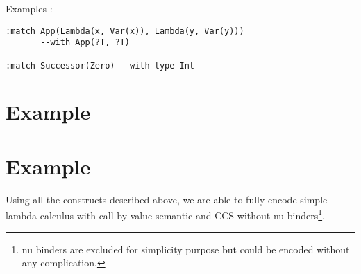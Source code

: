 \documentclass[12pt,a4paper]{article}
\begin{document}
Examples : 
\begin{verbatim}
:match App(Lambda(x, Var(x)), Lambda(y, Var(y))) 
       --with App(?T, ?T) 

:match Successor(Zero) --with-type Int
\end{verbatim}

\section{Example}
\section{Example}
Using all the constructs described above, we are able to fully encode simple 
lambda-calculus with call-by-value semantic and CCS without nu binders\footnote{nu 
binders are excluded for simplicity purpose but could be encoded without any 
complication.}.
\end{document}
